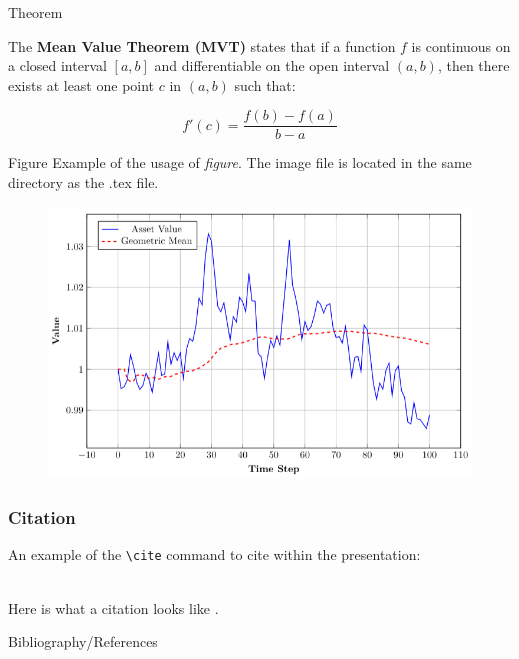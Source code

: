 \documentclass[aspectratio=169,xcolor=dvipsnames]{beamer}
\begin{document}
\begin{frame}{Theorem}
    \begin{theorem}
The \textbf{Mean Value Theorem (MVT)} states that if a function \( f \) is continuous on a closed interval \( [a,b] \) and differentiable on the open interval \( (a,b) \), then there exists at least one point \( c \) in \( (a,b) \) such that:

\[
f'(c) = \frac{f(b) - f(a)}{b - a}
\]
    \end{theorem}
\end{frame}


\begin{frame}{Figure}
    Example of the usage of \textit{figure}. The image file is located in the same directory as the .tex file.
    \begin{figure}
    \includegraphics[width=0.6\linewidth]{GM.png}
    \end{figure}
\end{frame}


\begin{frame}[fragile] %
    \frametitle{Citation}
    An example of the \verb|\cite| command to cite within the presentation:\\~

    Here is what a citation looks like \cite{p1}.
\end{frame}


\begin{frame}{Bibliography/References}
    \nocite{*}
    \footnotesize
    
    
\end{frame}


\begin{frame}
\centering
    \vspace*{\fill}
\end{frame}

\end{document}
